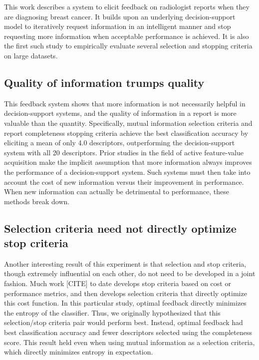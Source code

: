 This work describes a system to elicit feedback on radiologist reports when they are diagnosing breast cancer. It builds upon an underlying decision-support model to iteratively request information in an intelligent manner and stop requesting more information when acceptable performance is achieved. It is also the first such study to empirically evaluate several selection and stopping criteria on large datasets.


\subsection{Quality of information trumps quality}
This feedback system shows that more information is not necessarily helpful in decision-support systems, and the quality of information in a report is more valuable than the quantity. Specifically, mutual information selection criteria and report completeness stopping criteria achieve the best classification accuracy by eliciting a mean of only 4.0 descriptors, outperforming the decision-support system with all 20 descriptors. Prior studies in the field of active feature-value acquisition make the implicit assumption that more information always improves the performance of a decision-support system. Such systems must then take into account the cost of new information versus their improvement in performance. When new information can actually be detrimental to performance, these methods break down.

\subsection{Selection criteria need not directly optimize stop criteria}
Another interesting result of this experiment is that selection and stop criteria, though extremely influential on each other, do not need to be developed in a joint fashion. Much work [CITE] to date develops stop criteria based on cost or performance metrics, and then develops selection criteria that directly optimize this cost function. In this particular study, optimal feedback directly minimizes the entropy of the classifier. Thus, we originally hypothesized that this selection/stop criteria pair would perform best. Instead, optimal feedback had best classification accuracy and fewer descriptors selected using the completeness score. This result held even when using mutual information as a selection criteria, which directly minimizes entropy in expectation.


